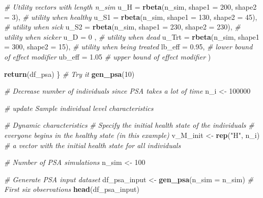 \documentclass[
]{article}
\newenvironment{Shaded}{\begin{snugshade}}{\end{snugshade}}
\newcommand{\CommentTok}[1]{\textcolor[rgb]{0.56,0.35,0.01}{\textit{#1}}}
\newcommand{\DataTypeTok}[1]{\textcolor[rgb]{0.13,0.29,0.53}{#1}}
\newcommand{\DecValTok}[1]{\textcolor[rgb]{0.00,0.00,0.81}{#1}}
\newcommand{\FloatTok}[1]{\textcolor[rgb]{0.00,0.00,0.81}{#1}}
\newcommand{\KeywordTok}[1]{\textcolor[rgb]{0.13,0.29,0.53}{\textbf{#1}}}
\newcommand{\NormalTok}[1]{#1}
\newcommand{\StringTok}[1]{\textcolor[rgb]{0.31,0.60,0.02}{#1}}
\begin{document}
\begin{Shaded}
\begin{Highlighting}[]
    \CommentTok{# Utility vectors with length n_sim }
    \DataTypeTok{u_H   =} \KeywordTok{rbeta}\NormalTok{(n_sim, }\DataTypeTok{shape1 =} \DecValTok{200}\NormalTok{, }\DataTypeTok{shape2 =} \DecValTok{3}\NormalTok{),   }\CommentTok{# utility when healthy}
    \DataTypeTok{u_S1  =} \KeywordTok{rbeta}\NormalTok{(n_sim, }\DataTypeTok{shape1 =} \DecValTok{130}\NormalTok{, }\DataTypeTok{shape2 =} \DecValTok{45}\NormalTok{),  }\CommentTok{# utility when sick}
    \DataTypeTok{u_S2  =} \KeywordTok{rbeta}\NormalTok{(n_sim, }\DataTypeTok{shape1 =} \DecValTok{230}\NormalTok{, }\DataTypeTok{shape2 =} \DecValTok{230}\NormalTok{), }\CommentTok{# utility when sicker}
    \DataTypeTok{u_D   =} \DecValTok{0}\NormalTok{                                       , }\CommentTok{# utility when dead}
    \DataTypeTok{u_Trt =} \KeywordTok{rbeta}\NormalTok{(n_sim, }\DataTypeTok{shape1 =} \DecValTok{300}\NormalTok{, }\DataTypeTok{shape2 =} \DecValTok{15}\NormalTok{),  }\CommentTok{# utility when being treated}
    \DataTypeTok{lb_eff  =} \FloatTok{0.95}\NormalTok{,                           }\CommentTok{# lower bound of effect modifier}
    \DataTypeTok{ub_eff  =} \FloatTok{1.05}                            \CommentTok{# upper bound of effect modifier}
\NormalTok{    )}

  \KeywordTok{return}\NormalTok{(df_psa)}
\NormalTok{\}}
\CommentTok{# Try it}
\KeywordTok{gen_psa}\NormalTok{(}\DecValTok{10}\NormalTok{) }

\CommentTok{# Decrease number of individuals since PSA takes a lot of time}
\NormalTok{n_i <-}\StringTok{ }\DecValTok{100000}

\CommentTok{# update Sample individual level characteristics }

\CommentTok{# Dynamic characteristics }
\CommentTok{# Specify the initial health state of the individuals }
\CommentTok{# everyone begins in the healthy state (in this example)}
\NormalTok{v_M_init  <-}\StringTok{ }\KeywordTok{rep}\NormalTok{(}\StringTok{"H"}\NormalTok{, n_i)    }\CommentTok{# a vector with the initial health state for all individuals }


\CommentTok{# Number of PSA simulations}
\NormalTok{n_sim <-}\StringTok{ }\DecValTok{100}

\CommentTok{# Generate PSA input dataset}
\NormalTok{df_psa_input <-}\StringTok{ }\KeywordTok{gen_psa}\NormalTok{(}\DataTypeTok{n_sim =}\NormalTok{ n_sim)}
\CommentTok{# First six observations}
\KeywordTok{head}\NormalTok{(df_psa_input)}


\end{Highlighting}
\end{Shaded}
\end{document}
